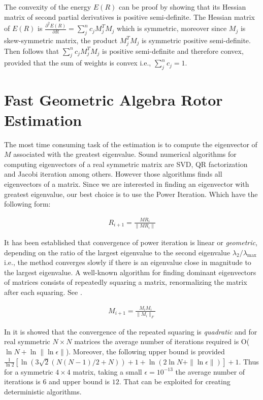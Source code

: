 \documentclass{birkjour}
\numberwithin{equation}{section}
\begin{document}
The convexity of the energy $E(R)$ can be proof by showing that its Hessian matrix of second partial derivatives is positive semi-definite. The Hessian matrix of $E(R)$ is $\frac{\partial^2 E(R)}{\partial R} = \sum_j^n { c_j M_j^T M_j}$ which is symmetric, moreover since $M_j$ is skew-symmetric matrix, the product $M_j^T M_j$ is symmetric positive semi-definite. Then follows that $\sum_j^n { c_j M_j^T M_j}$ is positive semi-definite and therefore convex, provided that the sum of weights is convex i.e., $\sum_j^n { c_j } = 1$.

\section{Fast Geometric Algebra Rotor Estimation}

The most time consuming task of the estimation is to compute the eigenvector of $M$ associated with the greatest eigenvalue. Sound numerical algorithms for computing eigenvectors of a real symmetric matrix are SVD, QR factorization and Jacobi iteration among others. However those algorithms finds all eigenvectors of a matrix. Since we are interested in finding an eigenvector with greatest eigenvalue, our best choice is to use the Power Iteration. Which have the following form:

\begin{eqnarray*}
R_{i+1} = \frac{M R_i}{\| M R_i \|}
\end{eqnarray*}

It has been established that convergence of power iteration is linear or \emph{geometric}, depending on the ratio of the largest eigenvalue to the second eigenvalue $\lambda_2 / \lambda_{\max}$ i.e., the method converges slowly if there is an eigenvalue close in magnitude to the largest eigenvalue. A well-known algorithm for finding dominant eigenvectors of matrices consists of repeatedly squaring a matrix, renormalizing the matrix after each squaring. See \cite{Wilkinson1988}.

\begin{eqnarray*}
	M_{i+1} = \frac{M_i M_i}{\| M_i \|_F}
\end{eqnarray*}

In \cite{Kostlan1991} it is showed that the convergence of the repeated squaring is \emph{quadratic} and for real symmetric $N \times N$ matrices the average number of iterations required is O($\ln N + \ln \|\ln \epsilon\|$). Moreover, the following upper bound is provided $\frac{1}{\ln 2} [ \ln( 3 \sqrt{2} ( N ( N - 1 ) / 2 + N ) ) + 1 + \ln( 2 \ln N + \|\ln \epsilon\|) ] + 1$. Thus for a symmetric $4 \times 4$ matrix, taking a small $\epsilon = 10^{-13}$ the average number of iterations is $6$ and upper bound is $12$. That can be exploited for creating deterministic algorithms.
\end{document}

